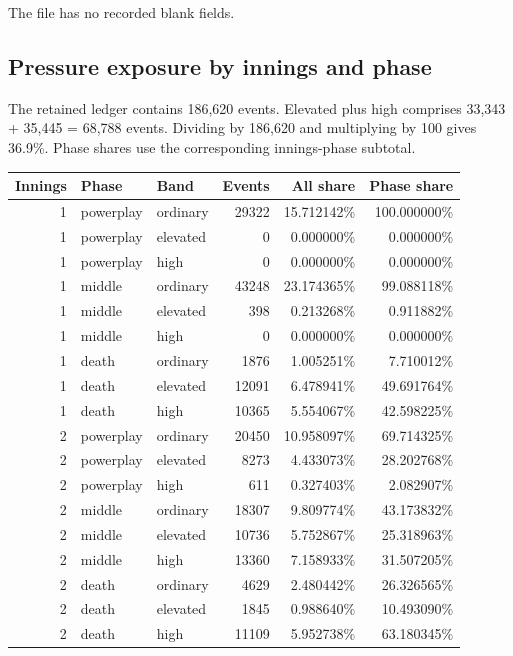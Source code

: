 The file has no recorded blank fields.

\subsection{Pressure exposure by innings and phase}

The retained ledger contains 186,620 events. Elevated plus high comprises 33,343 + 35,445 = 68,788 events. Dividing by 186,620 and multiplying by 100 gives 36.9\%. Phase shares use the corresponding innings-phase subtotal.

\begin{center}
\begin{tabularx}{\linewidth}{r>{\raggedright\arraybackslash}X>{\raggedright\arraybackslash}Xrrr}
\toprule
Innings & Phase & Band & Events & All share & Phase share \\
\midrule
1 & powerplay & ordinary & 29322 & 15.712142\% & 100.000000\% \\
1 & powerplay & elevated & 0 & 0.000000\% & 0.000000\% \\
1 & powerplay & high & 0 & 0.000000\% & 0.000000\% \\
1 & middle & ordinary & 43248 & 23.174365\% & 99.088118\% \\
1 & middle & elevated & 398 & 0.213268\% & 0.911882\% \\
1 & middle & high & 0 & 0.000000\% & 0.000000\% \\
1 & death & ordinary & 1876 & 1.005251\% & 7.710012\% \\
1 & death & elevated & 12091 & 6.478941\% & 49.691764\% \\
1 & death & high & 10365 & 5.554067\% & 42.598225\% \\
2 & powerplay & ordinary & 20450 & 10.958097\% & 69.714325\% \\
2 & powerplay & elevated & 8273 & 4.433073\% & 28.202768\% \\
2 & powerplay & high & 611 & 0.327403\% & 2.082907\% \\
2 & middle & ordinary & 18307 & 9.809774\% & 43.173832\% \\
2 & middle & elevated & 10736 & 5.752867\% & 25.318963\% \\
2 & middle & high & 13360 & 7.158933\% & 31.507205\% \\
2 & death & ordinary & 4629 & 2.480442\% & 26.326565\% \\
2 & death & elevated & 1845 & 0.988640\% & 10.493090\% \\
2 & death & high & 11109 & 5.952738\% & 63.180345\% \\
\bottomrule
\end{tabularx}
\end{center}

